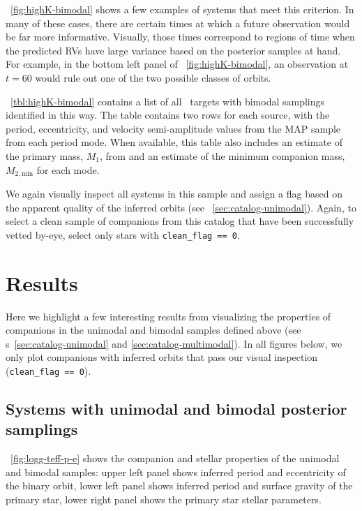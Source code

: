 \documentclass[modern, letterpaper]{aastex62}
\newcommand{\apogee}{\project{\acronym{APOGEE}}}
\begin{document}
\figurename~\ref{fig:highK-bimodal} shows a few examples of systems that meet
this criterion.
In many of these cases, there are certain times at which a future observation
would be far more informative.
Visually, those times correspond to regions of time when the predicted RVs have
large variance based on the posterior samples at hand.
For example, in the bottom left panel of \figurename~\ref{fig:highK-bimodal}, an
observation at $t = 60$ would rule out one of the two possible  classes of
orbits.

\tablename~\ref{tbl:highK-bimodal} contains a list of all \apogee\ targets with
bimodal samplings identified in this way.
The table contains two rows for each source, with the period, eccentricity, and
velocity semi-amplitude values from the MAP sample from each period mode.
When available, this table also includes an estimate of the primary mass, $M_1$,
from \citet{Ness:2015} and an estimate of the minimum companion mass, $M_{2,
\textrm{min}}$ for each mode.

We again visually inspect all systems in this sample and assign a flag based on
the apparent quality of the inferred orbits (see
\sectionname~\ref{sec:catalog-unimodal}).
Again, to select a clean sample of companions from this catalog that have been
successfully vetted by-eye, select only stars with \texttt{clean\_flag == 0}.



\section{Results}
\label{sec:results}

Here we highlight a few interesting results from visualizing the properties of
companions in the unimodal and bimodal samples defined above (see \sectionname
s~\ref{sec:catalog-unimodal} and \ref{sec:catalog-multimodal}).
In all figures below, we only plot companions with inferred orbits that pass our
visual inspection (\texttt{clean\_flag == 0}).

\subsection{Systems with unimodal and bimodal posterior samplings}

\figurename~\ref{fig:logg-teff-p-e} shows the companion and stellar properties
of the unimodal and bimodal samples: upper left panel shows inferred period and
eccentricity of the binary orbit, lower left panel shows inferred period and
surface gravity of the primary star, lower right panel shows the primary star
stellar parameters.
\end{document}
